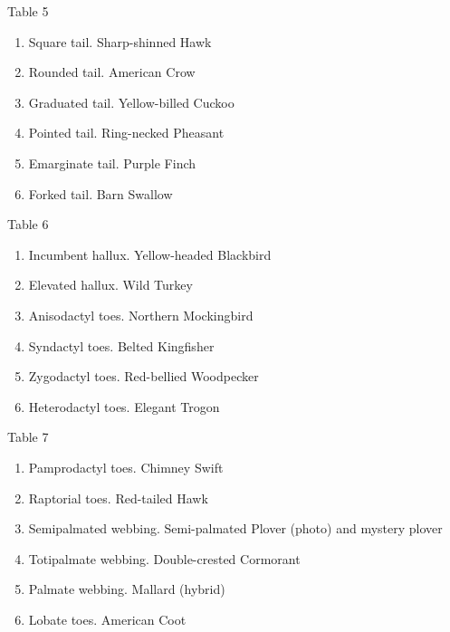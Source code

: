 \documentclass[10pt]{article}
\begin{document}
\begin{multicols}{2}
Table 5
\begin{enumerate}[resume]
\item  Square tail. Sharp-shinned Hawk
\item  Rounded tail. American Crow
\item  Graduated tail. Yellow-billed Cuckoo
\item  Pointed tail. Ring-necked Pheasant
\item  Emarginate tail. Purple Finch
\item  Forked tail. Barn Swallow
\end{enumerate}

Table 6
\begin{enumerate}[resume]
\item  Incumbent hallux. Yellow-headed Blackbird
\item  Elevated hallux. Wild Turkey
\item  Anisodactyl toes. Northern Mockingbird
\item  Syndactyl toes. Belted Kingfisher
\item  Zygodactyl toes. Red-bellied Woodpecker
\item  Heterodactyl toes. Elegant Trogon
\end{enumerate}

Table 7
\begin{enumerate}[resume]
\item Pamprodactyl toes. Chimney Swift
\item  Raptorial toes. Red-tailed Hawk
\item  Semipalmated webbing. Semi-palmated Plover (photo) and mystery plover
\item  Totipalmate webbing. Double-crested Cormorant
\item  Palmate webbing. Mallard (hybrid)
\item  Lobate toes. American Coot
\end{enumerate}

\end{multicols}
\end{document}
